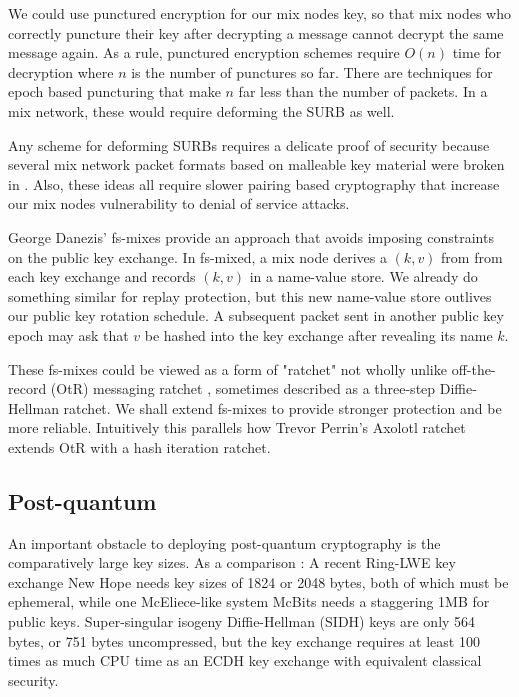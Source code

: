 \documentclass[twoside,letterpaper]{llncs}
\begin{document}
We could use punctured encryption \cite{libforwardsec} for our
mix nodes key, so that mix nodes who correctly puncture their key
after decrypting a message cannot decrypt the same message again. 
As a rule, punctured encryption schemes require $O(n)$ time for
decryption where $n$ is the number of punctures so far.  There are
techniques for epoch based puncturing that make $n$ far less than
the number of packets.  In a mix network, these would require
deforming the SURB as well. 

Any scheme for deforming SURBs requires a delicate proof of security
because several mix network packet formats based on malleable key
material were broken in \cite{Danezis2006}. 
Also, these ideas all require slower pairing based cryptography that
increase our mix nodes vulnerability to denial of service attacks. 

George Danezis' fs-mixes \cite{fs-mix} provide an approach that
avoids imposing constraints on the public key exchange.  In fs-mixed,
a mix node derives a $(k,v)$ from from each key exchange and records
$(k,v)$  in a name-value store.  We already do something similar for 
replay protection, but this new name-value store outlives our public
key rotation schedule.  A subsequent packet sent in another public
key epoch may ask that $v$ be hashed into the key exchange after
revealing its name $k$.  

These fs-mixes could be viewed as a form of "ratchet" not wholly
unlike off-the-record (OtR) messaging ratchet \cite{OtR},
sometimes described as a three-step Diffie-Hellman ratchet.  
We shall extend fs-mixes to provide stronger protection and be more
reliable.  Intuitively this parallels how Trevor Perrin's Axolotl 
ratchet extends OtR with a hash iteration ratchet. 

\subsection{Post-quantum}

An important obstacle to deploying post-quantum cryptography is
the comparatively large key sizes.  As a comparison : 
%
A recent Ring-LWE key exchange New Hope \cite[\S7, p.10]{NewHope} needs
 key sizes of 1824 or 2048 bytes, both of which must be ephemeral,
while one McEliece-like system McBits %
 needs a staggering 1MB for public keys.
%
Super-singular isogeny Diffie-Hellman (SIDH) \cite[p. 21]{SIDH-2016} keys
are only 564 bytes, or 751 bytes uncompressed, but
 the key exchange requires at least 100 times as much CPU time as
 an ECDH key exchange with equivalent classical security.
\end{document}
